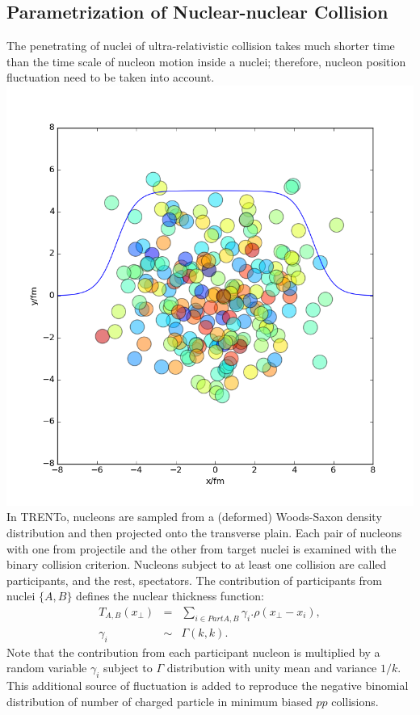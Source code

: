 \documentclass[aps,prl,twocolumn,groupedaddress]{revtex4-1}
\begin{document}
	\subsection{Parametrization of Nuclear-nuclear Collision}
	The penetrating of nuclei of ultra-relativistic collision takes much shorter time than the time scale of nucleon motion inside a nuclei; therefore, nucleon position fluctuation need to be taken into account. 
	\includegraphics[width=\columnwidth]{pics/nuclei.png}
	In TRENTo, nucleons are sampled from a (deformed) Woods-Saxon density distribution and then projected onto the transverse plain. 
	Each pair of nucleons with one from projectile and the other from target nuclei is examined with the binary collision criterion. 
	Nucleons subject to at least one collision are called participants, and the rest, spectators.
	The contribution of participants from nuclei $\{A,B\}$ defines the nuclear thickness function:
	\begin{eqnarray}
		T_{A,B}(x_\perp) &=& \sum_{i \in Part A,B} \gamma_i. \rho(x_\perp- x_i), \\
		\gamma_i &\sim& \Gamma(k, k).
	\end{eqnarray}
	Note that the contribution from each participant nucleon is multiplied by a random variable $\gamma_i$ subject to $\Gamma$ distribution with unity mean and variance $1/k$. 
	This additional source of fluctuation is added to reproduce the negative binomial distribution of number of charged particle in minimum biased $pp$ collisions.
\end{document}
